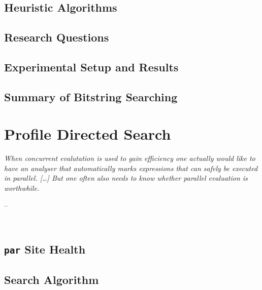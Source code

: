 \documentclass[openright, dottedtoc, headinclude, footinclude=true, a4paper, numbers=noenddot]{scrreprt}
\makeatletter
\newenvironment{chapquote}[2][2em]
  {\setlength{\@tempdima}{#1}%
   \def\chapquote@author{#2}%
   \parshape 1 \@tempdima \dimexpr\textwidth-2\@tempdima\relax%
   \itshape}
  {\par\normalfont\hfill--\ \chapquote@author\hspace*{\@tempdima}\par\noindent\hrulefill\\[1cm]}
\makeatother
\begin{document}
        \section{Heuristic Algorithms}
        \label{sec:blind-ParFunc}
        

        \section{Research Questions}
        \label{sec:hypotheses}
        
    
        \section{Experimental Setup and Results}
        \label{sec:blind-Results}
        
    
        \section{Summary of Bitstring Searching}
        \label{sec:blind-Conclusion}
        
    
    \chapter{Profile Directed Search}
    \label{chap:prof-search}
    \begin{chapquote}{\cite{dutchBook}}
    When concurrent evalutation is used to gain efficiency one actually would
    like to have an analyser that \emph{automatically} marks expressions that
    can safely be executed in parallel. [\dots] But one often also needs to know whether parallel evaluation
    is \emph{worthwhile}.
    \end{chapquote}
    

        \section{\texttt{par} Site Health}
        \label{sec:parHealth}
        

        \section{Search Algorithm}
        \label{sec:search1}
        
    
\end{document}
